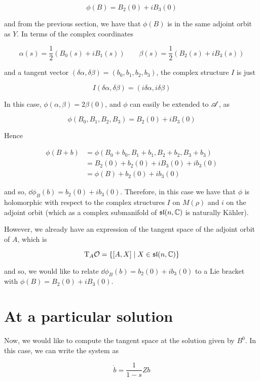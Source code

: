 \documentclass{report}
\renewcommand{\sl}{\mathfrak{sl}}
\begin{document}
\[\phi(B) = B_2(0) + iB_3(0)\]

and from the previous section, we have that \(\phi(B)\) is in the same adjoint orbit as \(Y\). In terms of the complex coordinates

\[\alpha(s) = \frac12(B_0(s) + iB_1(s)) \qquad \beta(s) = \frac12(B_2(s) + iB_3(s))\]

and a tangent vector \((\delta\alpha, \delta\beta) = (b_0, b_1, b_2, b_3)\), the complex structure \(I\) is just

\[I(\delta\alpha, \delta\beta) = (i\delta\alpha, i\delta\beta)\]

In this case, \(\phi(\alpha, \beta) = 2\beta(0)\), and \(\phi\) can easily be extended to \(\mathscr{A}\), as

\[\phi(B_0, B_1, B_2, B_3) = B_2(0) + iB_3(0)\]

Hence

\begin{align*}
    \phi(B + b) &= \phi(B_0 + b_0, B_1 + b_1, B_2 + b_2, B_3 + b_3) \\
    &= B_2(0) + b_2(0) + iB_3(0) + ib_3(0) \\
    &= \phi(B) + b_2(0) + ib_3(0) 
\end{align*}

and so, \(\dd\phi_B(b) = b_2(0) + ib_3(0)\). Therefore, in this case we have that \(\phi\) is holomorphic with respect to the complex structures \(I\) on \(M(\rho)\) and \(i\) on the adjoint orbit (which as a complex submanifold of \(\sl(n, \C)\) is naturally K\"ahler).

However, we already have an expression of the tangent space of the adjoint orbit of \(A\), which is

\[\T_A\mcO = \left\{[A, X] \mid X \in \sl(n, \C)\right\}\]

and so, we would like to relate \(\dd\phi_B(b) = b_2(0) + ib_3(0)\) to a Lie bracket with \(\phi(B) = B_2(0) + iB_3(0)\).

\section{At a particular solution}

Now, we would like to compute the tangent space at the solution given by \(B^0\). In this case, we can write the system as

\begin{equation}
    \label{eq:particular-solution-ode}
    \dot b = \frac{1}{1-s}Zb
\end{equation}
\end{document}
